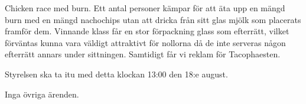 \documentclass{protokoll}
\begin{document}
Chicken race med burn. Ett antal personer kämpar för att äta upp en mängd burn med en mängd nachochips utan att dricka från sitt glas mjölk som placerats framför dem. Vinnande klass får en stor förpackning glass som efterrätt, vilket förväntas kunna vara väldigt attraktivt för nollorna då de inte serveras någon efterrätt annars under sittningen.
Samtidigt får vi reklam för Tacophaesten.

Styrelsen ska ta itu med detta klockan 13:00 den 18:e august.

Inga övriga ärenden.
\end{document}
